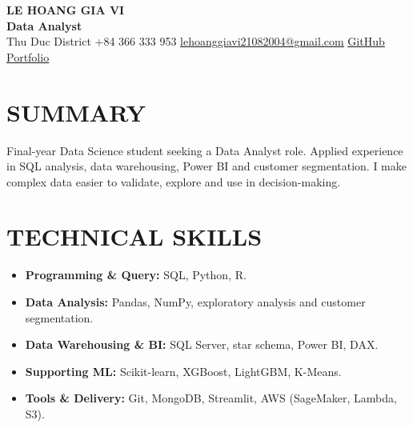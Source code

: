 \documentclass[10pt,letterpaper]{article}
\newcommand{\cvsection}[2]{\section*{\faIcon{#1}\hspace{0.45em}#2}}
\newcommand{\cvlink}[2]{\href{#1}{\underline{#2}}}
\newcommand{\cvitem}[1]{\item \small #1}
\begin{document}
\begin{center}
  {\fontsize{20}{22}\selectfont\bfseries LE HOANG GIA VI}\\[0.22em]
  {\fontsize{17}{19}\selectfont\bfseries Data Analyst}\\[0.42em]
  {\small
  \hspace{0.2em}Thu Duc District
  \quad
  \hspace{0.2em}+84 366 333 953
  \quad
  \hspace{0.2em}\cvlink{mailto:lehoanggiavi21082004@gmail.com}{lehoanggiavi21082004@gmail.com}
  \quad
  \hspace{0.2em}\cvlink{https://github.com/lehoanggiavi}{GitHub}
  \quad
  \hspace{0.2em}\cvlink{https://lehoanggiavi.github.io/portfolio/?role=da}{Portfolio}}
\end{center}

\cvsection{user}{SUMMARY}
\normalsize
Final-year Data Science student seeking a Data Analyst role. Applied experience in SQL analysis,
data warehousing, Power BI and customer segmentation. I make complex data easier to validate,
explore and use in decision-making.

\cvsection{tools}{TECHNICAL SKILLS}
\begin{itemize}[leftmargin=1.55em,itemsep=0em,topsep=0em,parsep=0em]
  \cvitem{\textbf{Programming \& Query:} SQL, Python, R.}
  \cvitem{\textbf{Data Analysis:} Pandas, NumPy, exploratory analysis and customer segmentation.}
  \cvitem{\textbf{Data Warehousing \& BI:} SQL Server, star schema, Power BI, DAX.}
  \cvitem{\textbf{Supporting ML:} Scikit-learn, XGBoost, LightGBM, K-Means.}
  \cvitem{\textbf{Tools \& Delivery:} Git, MongoDB, Streamlit, AWS (SageMaker, Lambda, S3).}
\end{itemize}
\end{document}
